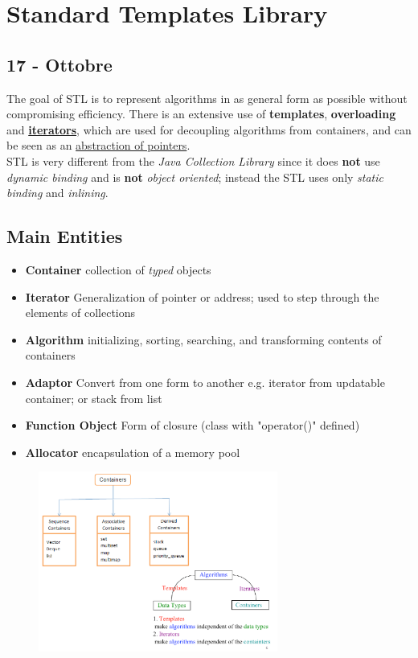 \chapter{Standard Templates Library}
\section*{17 - Ottobre}
The goal of STL is to represent algorithms in as general form as possible without compromising efficiency.
There is an extensive use of \textbf{templates}, \textbf{overloading} and \ul{\textbf{iterators}},
which are used for decoupling algorithms from containers,
and can be seen as an \ul{abstraction of pointers}.\\
STL is very different from the \textit{Java Collection Library} since it does \textbf{not} use \textit{dynamic binding} and is \textbf{not} \textit{object oriented};
instead the STL uses only \textit{static binding} and \textit{inlining}.

\section{Main Entities}
\begin{itemize}
   \item \textbf{Container} collection of \textit{typed} objects
   \item \textbf{Iterator} Generalization of pointer or address;
   used to step through the elements of collections
   \item \textbf{Algorithm} initializing, sorting, searching, and transforming contents of containers
   \item \textbf{Adaptor} Convert from one form to another e.g. iterator from updatable container; or stack from list
   \item \textbf{Function Object} Form of closure (class with "operator()" defined)
   \item \textbf{Allocator} encapsulation of a memory pool
\end{itemize}

\begin{figure}[h]
   \centering
   \includegraphics[width=0.7\textwidth]{images/STL_containers.png}
   \label{fig:STL_containers}
\end{figure}

